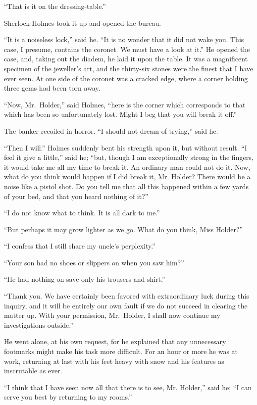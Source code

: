 “That is it on the dressing-table.”

Sherlock Holmes took it up and opened the bureau.

“It is a noiseless lock,” said he. “It is no wonder that it
did not wake you. This case, I presume, contains the coronet.
We must have a look at it.” He opened the case, and, taking
out the diadem, he laid it upon the table. It was a magnificent
specimen of the jeweller’s art, and the thirty-six stones
were the finest that I have ever seen. At one side of the
coronet was a cracked edge, where a corner holding three
gems had been torn away.

“Now, Mr.~Holder,” said Holmes, “here is the corner
which corresponds to that which has been so unfortunately
lost. Might I beg that you will break it off.”

The banker recoiled in horror. “I should not dream of
trying,” said he.

“Then I will.” Holmes suddenly bent his strength upon
it, but without result. “I feel it give a little,” said he; “but,
though I am exceptionally strong in the fingers, it would take
me all my time to break it. An ordinary man could not do it.
Now, what do you think would happen if I did break it, Mr.
Holder? There would be a noise like a pistol shot. Do you
tell me that all this happened within a few yards of your bed,
and that you heard nothing of it?”

“I do not know what to think. It is all dark to me.”

“But perhaps it may grow lighter as we go. What do you
think, Miss Holder?”

“I confess that I still share my uncle’s perplexity.”

“Your son had no shoes or slippers on when you saw
him?”

“He had nothing on save only his trousers and shirt.”

“Thank you. We have certainly been favored with extraordinary
luck during this inquiry, and it will be entirely
our own fault if we do not succeed in clearing the matter up.
With your permission, Mr.~Holder, I shall now continue my
investigations outside.”

He went alone, at his own request, for he explained that
any unnecessary footmarks might make his task more difficult.
For an hour or more he was at work, returning at last
with his feet heavy with snow and his features as inscrutable
as ever.

“I think that I have seen now all that there is to see, Mr.
Holder,” said he; “I can serve you best by returning to
my rooms.”

